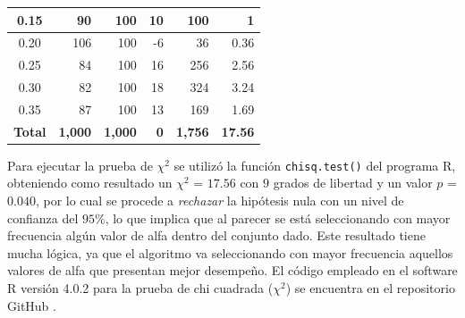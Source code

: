 \documentclass{article}
\begin{document}
\begin{table}
\begin{tabular}{|c|r|r|r|r|r|}
0.15                                 & 90                                                                             & 100                                                                           & 10                       & 100                            & 1                                \\ \hline
0.20                                 & 106                                                                            & 100                                                                           & -6                       & 36                             & 0.36                             \\ \hline
0.25                                 & 84                                                                             & 100                                                                           & 16                       & 256                            & 2.56                             \\ \hline
0.30                                 & 82                                                                             & 100                                                                           & 18                       & 324                            & 3.24                             \\ \hline
0.35                                 & 87                                                                             & 100                                                                           & 13                       & 169                            & 1.69                             \\ \hline
\multicolumn{1}{|l|}{\textbf{Total}} & \textbf{1,000}                                                                 & \textbf{1,000}                                                                & \textbf{0}               & \textbf{1,756}                 & \textbf{17.56}                   \\ \hline
\end{tabular}
\label{tablacontingencia}
\end{table}

Para ejecutar la prueba de $\chi^{2}$ se utilizó la función \texttt{chisq.test()} del programa R, obteniendo como resultado un  $\chi^{2}$ = $17.56$ con $9$ grados de libertad y un valor $p$ = $0.040$, por lo cual se procede a \textit{rechazar} la hipótesis nula con un nivel de confianza del $95\%$, lo que implica que al parecer se está seleccionando con mayor frecuencia algún valor de alfa dentro del conjunto dado. Este resultado tiene mucha lógica, ya que el algoritmo va seleccionando con mayor frecuencia aquellos valores de alfa que presentan mejor desempeño. El código empleado en el software R versión 4.0.2 para la prueba de chi cuadrada ($\chi^{2}$) se encuentra en el repositorio GitHub \cite{github}.
\end{document}
